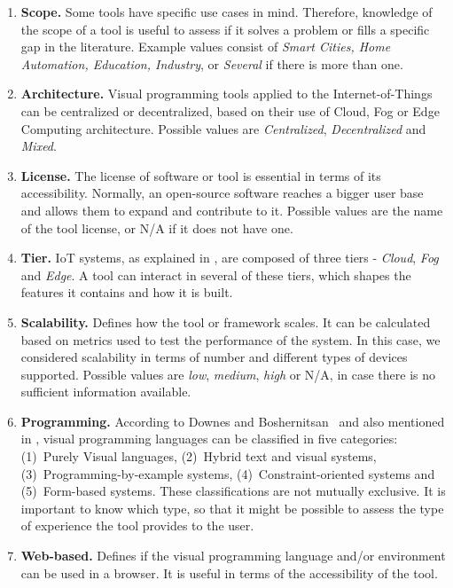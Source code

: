 \begin{enumerate}
    \item\textbf{Scope.} Some tools have specific use cases in mind. Therefore, knowledge of the scope of a tool is useful to assess if it solves a problem or fills a specific gap in the literature. Example values consist of \textit{Smart Cities, Home Automation, Education, Industry}, or \textit{Several} if there is more than one. 
    \item\textbf{Architecture.} Visual programming tools applied to the Internet-of-Things can be centralized or decentralized, based on their use of Cloud, Fog or Edge Computing architecture. Possible values are \textit{Centralized}, \textit{Decentralized} and \textit{Mixed}.
    \item\textbf{License.} The license of software or tool is essential in terms of its accessibility. Normally, an open-source software reaches a bigger user base and allows them to expand and contribute to it. Possible values are the name of the tool license, or N/A if it does not have one.
    \item\textbf{Tier.} IoT systems, as explained in , are composed of three tiers - \textit{Cloud}, \textit{Fog} and \textit{Edge}. A tool can interact in several of these tiers, which shapes the features it contains and how it is built.
    \item\textbf{Scalability.} Defines how the tool or framework scales. It can be calculated based on metrics used to test the performance of the system. In this case, we considered scalability in terms of number and different types of devices supported. Possible values are \textit{low}, \textit{medium}, \textit{high} or N/A, in case there is no sufficient information available.
    \item\textbf{Programming.} According to Downes and Boshernitsan~\cite{vpls_survey} and also mentioned in , visual programming languages can be classified in five categories: (1)~Purely Visual languages, (2)~Hybrid text and visual systems, (3)~Programming-by-example systems, (4)~Constraint-oriented systems and (5)~Form-based systems. These classifications are not mutually exclusive. It is important to know which type, so that it might be possible to assess the type of experience the tool provides to the user.
    \item\textbf{Web-based.} Defines if the visual programming language and/or environment can be used in a browser. It is useful in terms of the accessibility of the tool.
\end{enumerate}

